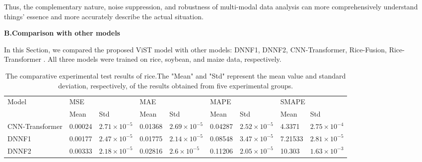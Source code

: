 \documentclass[acmsmall,manuscript, screen, review]{acmart}
\begin{document}
Thus, the complementary nature, noise suppression, and robustness of multi-modal data analysis can more comprehensively understand things’ essence and more accurately describe the actual situation.




\textbf{B.Comparison with other models}

In this Section, we compared the proposed ViST model with other models: DNNF1, DNNF2, CNN-Transformer, Rice-Fusion, Rice-Transformer . All three models were trained on rice, soybean, and maize data, respectively.

\begin{table}[htbp]
  \centering
  \caption{The comparative experimental test results of rice.The "Mean" and "Std" represent the mean value and standard deviation, respectively, of the results obtained from five experimental groups.}
    \begin{tabular}{lllllllll}
    \toprule
    \multicolumn{1}{l}{\multirow{2}[4]{*}{Model}} & \multicolumn{2}{l}{MSE} & \multicolumn{2}{l}{MAE} & \multicolumn{2}{l}{MAPE} & \multicolumn{2}{l}{SMAPE} \\
\cmidrule{2-9}          & Mean  & Std   & Mean  & Std   & Mean  & Std   & Mean  & Std \\
    \midrule
    CNN-Transformer & 0.00024 & \begin{math}2.71\times 10^{-5}\end{math} & 0.01368 & \begin{math}2.69\times 10^{-5}\end{math} & 0.04287 & \begin{math}2.52\times 10^{-5}\end{math} & 4.3371 & \begin{math}2.75\times 10^{-4}\end{math} \\
    DNNF1 & 0.00177 & \begin{math}2.47\times 10^{-5}\end{math} & 0.01775 & \begin{math}2.14\times 10^{-5}\end{math} & 0.08548 & \begin{math}3.47\times 10^{-5}\end{math} & 7.21533 & \begin{math}2.81\times 10^{-5}\end{math} \\
    DNNF2 & 0.00333 & \begin{math}2.18\times 10^{-5}\end{math} & 0.02816 & \begin{math}2.6\times 10^{-5}\end{math} & 0.11206 & \begin{math}2.05\times 10^{-5}\end{math} & 10.303 & \begin{math}1.63\times 10^{-3}\end{math} \\

\end{tabular}
\end{table}
\end{document}
